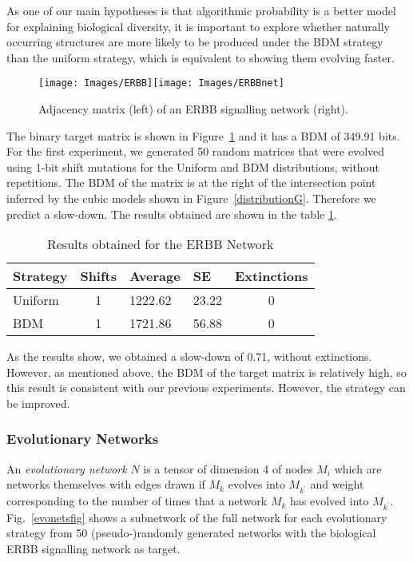 \documentclass[10pt]{article}
\begin{document}
As one of our main hypotheses is that algorithmic probability is a better model for explaining biological diversity, it is important to explore whether naturally occurring structures are more likely to be produced under the BDM strategy than the uniform strategy, which is equivalent to showing them evolving faster.

\begin{figure}[ht!]
    \centering
    \texttt{[image: Images/ERBB]}\hspace{1.5cm}\texttt{[image: Images/ERBBnet]}
    \caption{Adjacency matrix (left) of an ERBB signalling network (right).
        \label{erbbG}}
\end{figure}

The binary target matrix is shown in Figure~\ref{erbbG} and it has a BDM of 349.91 bits. For the first experiment, we generated 50 random
matrices that were evolved using 1-bit shift mutations for the Uniform and BDM distributions, without repetitions. The BDM of the matrix is at the right of the intersection point inferred by the cubic models shown in Figure~\ref{distributionG}. Therefore we predict a slow-down. The results obtained
are shown in the table \ref{erbbT}.

\begin{table}[h]
    \centering
    \caption{Results obtained for the ERBB Network}
    \label{erbbT}
\begin{tabular}[]{@{}lcllc@{}}
\hline
Strategy & Shifts & Average & SE & Extinctions\\
\hline
Uniform & 1 & 1222.62 & 23.22 & 0 \\
BDM & 1 & 1721.86 & 56.88 & 0\\
\hline
\end{tabular}
\end{table}

As the results show, we obtained a slow-down of
0.71, without extinctions. However, as mentioned above, the BDM of the target matrix is relatively high, so this result is consistent with our previous experiments. However, the strategy can be improved.

\subsubsection{Evolutionary Networks}\label{evonets}

An \textit{evolutionary network} $N$ is a tensor of dimension 4 of nodes $M_i$ which are networks themselves with edges drawn if $M_k$ evolves into $M_{k^\prime}$ and weight corresponding to the number of times that a network $M_k$ has evolved into $M_{k^\prime}$. Fig.~\ref{evonetsfig} shows a subnetwork of the full network for each evolutionary strategy from 50 (pseudo-)randomly generated networks with the biological ERBB signalling network as target. 
\end{document}
